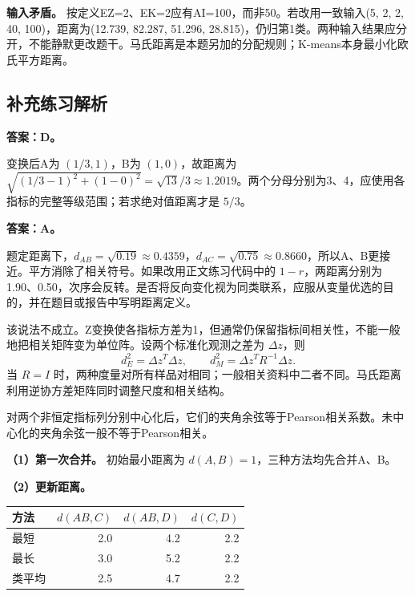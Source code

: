 \textbf{输入矛盾。} 按定义EZ=2、EK=2应有AI=100，而非50。若改用一致输入(5, 2, 2, 40, 100)，距离为(12.739, 82.287, 51.296, 28.815)，仍归第1类。两种输入结果应分开，不能静默更改题干。马氏距离是本题另加的分配规则；K-means本身最小化欧氏平方距离。

\subsection{补充练习解析}


\textbf{答案：D。}

变换后A为 \((1/3,1)\)，B为 \((1,0)\)，故距离为 \(\sqrt{(1/3-1)^2+(1-0)^2}=\sqrt{13}/3\approx1.2019\)。两个分母分别为3、4，应使用各指标的完整等级范围；若求绝对值距离才是 \(5/3\)。





\textbf{答案：A。}

题定距离下，\(d_{AB}=\sqrt{0.19}\approx0.4359\)，\(d_{AC}=\sqrt{0.75}\approx0.8660\)，所以A、B更接近。平方消除了相关符号。如果改用正文练习代码中的 \(1-r\)，两距离分别为1.90、0.50，次序会反转。是否将反向变化视为同类联系，应服从变量优选的目的，并在题目或报告中写明距离定义。





该说法不成立。Z变换使各指标方差为1，但通常仍保留指标间相关性，不能一般地把相关矩阵变为单位阵。设两个标准化观测之差为 \(\Delta z\)，则 \[d_E^2=\Delta z^T\Delta z,\qquad d_M^2=\Delta z^TR^{-1}\Delta z.\] 当 \(R=I\) 时，两种度量对所有样品对相同；一般相关资料中二者不同。马氏距离利用逆协方差矩阵同时调整尺度和相关结构。

对两个非恒定指标列分别中心化后，它们的夹角余弦等于Pearson相关系数。未中心化的夹角余弦一般不等于Pearson相关。





\textbf{（1）第一次合并。} 初始最小距离为 \(d(A,B)=1\)，三种方法均先合并A、B。

\textbf{（2）更新距离。}

\begin{center}\small\setlength{\tabcolsep}{4pt}\renewcommand{\arraystretch}{1.18}\begin{tabular}{@{}lrrr@{}}
\toprule
方法 & \(d(AB,C)\) & \(d(AB,D)\) & \(d(C,D)\) \\
\midrule

最短 & 2.0 & 4.2 & 2.2 \\
最长 & 3.0 & 5.2 & 2.2 \\
类平均 & 2.5 & 4.7 & 2.2 \\
\bottomrule\end{tabular}\end{center}

